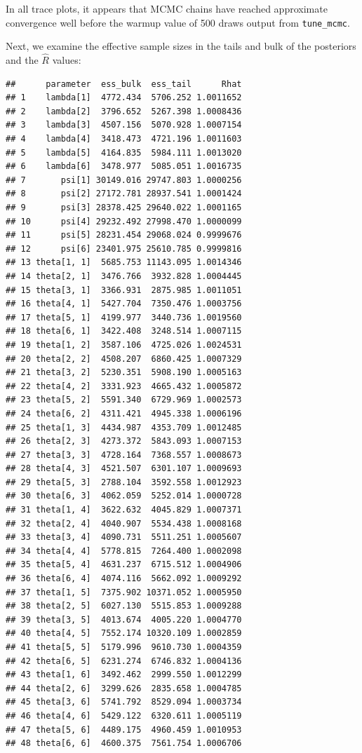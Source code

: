 \documentclass[
]{article}
\newenvironment{Shaded}{\begin{snugshade}}{\end{snugshade}}
\newcommand{\NormalTok}[1]{#1}
\newcommand{\SpecialCharTok}[1]{\textcolor[rgb]{0.81,0.36,0.00}{\textbf{#1}}}
\begin{document}
\linespread{1}

In all trace plots, it appears that MCMC chains have reached approximate convergence well before the warmup value of 500 draws output from \texttt{tune\_mcmc}.

Next, we examine the effective sample sizes in the tails and bulk of the posteriors and the \(\hat{R}\) values:

\linespread{1}

\begin{Shaded}
\end{Shaded}

\begin{verbatim}
##      parameter  ess_bulk  ess_tail      Rhat
## 1    lambda[1]  4772.434  5706.252 1.0011652
## 2    lambda[2]  3796.652  5267.398 1.0008436
## 3    lambda[3]  4507.156  5070.928 1.0007154
## 4    lambda[4]  3418.473  4721.196 1.0011603
## 5    lambda[5]  4164.835  5984.111 1.0013020
## 6    lambda[6]  3478.977  5085.051 1.0016735
## 7       psi[1] 30149.016 29747.803 1.0000256
## 8       psi[2] 27172.781 28937.541 1.0001424
## 9       psi[3] 28378.425 29640.022 1.0001165
## 10      psi[4] 29232.492 27998.470 1.0000099
## 11      psi[5] 28231.454 29068.024 0.9999676
## 12      psi[6] 23401.975 25610.785 0.9999816
## 13 theta[1, 1]  5685.753 11143.095 1.0014346
## 14 theta[2, 1]  3476.766  3932.828 1.0004445
## 15 theta[3, 1]  3366.931  2875.985 1.0011051
## 16 theta[4, 1]  5427.704  7350.476 1.0003756
## 17 theta[5, 1]  4199.977  3440.736 1.0019560
## 18 theta[6, 1]  3422.408  3248.514 1.0007115
## 19 theta[1, 2]  3587.106  4725.026 1.0024531
## 20 theta[2, 2]  4508.207  6860.425 1.0007329
## 21 theta[3, 2]  5230.351  5908.190 1.0005163
## 22 theta[4, 2]  3331.923  4665.432 1.0005872
## 23 theta[5, 2]  5591.340  6729.969 1.0002573
## 24 theta[6, 2]  4311.421  4945.338 1.0006196
## 25 theta[1, 3]  4434.987  4353.709 1.0012485
## 26 theta[2, 3]  4273.372  5843.093 1.0007153
## 27 theta[3, 3]  4728.164  7368.557 1.0008673
## 28 theta[4, 3]  4521.507  6301.107 1.0009693
## 29 theta[5, 3]  2788.104  3592.558 1.0012923
## 30 theta[6, 3]  4062.059  5252.014 1.0000728
## 31 theta[1, 4]  3622.632  4045.829 1.0007371
## 32 theta[2, 4]  4040.907  5534.438 1.0008168
## 33 theta[3, 4]  4090.731  5511.251 1.0005607
## 34 theta[4, 4]  5778.815  7264.400 1.0002098
## 35 theta[5, 4]  4631.237  6715.512 1.0004906
## 36 theta[6, 4]  4074.116  5662.092 1.0009292
## 37 theta[1, 5]  7375.902 10371.052 1.0005950
## 38 theta[2, 5]  6027.130  5515.853 1.0009288
## 39 theta[3, 5]  4013.674  4005.220 1.0004770
## 40 theta[4, 5]  7552.174 10320.109 1.0002859
## 41 theta[5, 5]  5179.996  9610.730 1.0004359
## 42 theta[6, 5]  6231.274  6746.832 1.0004136
## 43 theta[1, 6]  3492.462  2999.550 1.0012299
## 44 theta[2, 6]  3299.626  2835.658 1.0004785
## 45 theta[3, 6]  5741.792  8529.094 1.0003734
## 46 theta[4, 6]  5429.122  6320.611 1.0005119
## 47 theta[5, 6]  4489.175  4960.459 1.0010953
## 48 theta[6, 6]  4600.375  7561.754 1.0006706
\end{verbatim}
\end{document}
